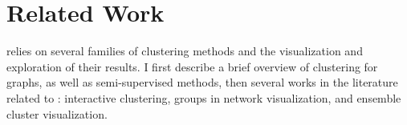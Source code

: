 
%
%


\section{Related Work}

\pkclustering relies on several families of clustering methods and the visualization and exploration of their results. I first describe a brief overview of clustering for graphs, as well as semi-supervised methods, then several works in the literature related to \va: interactive clustering, groups in network visualization, and ensemble cluster visualization.

